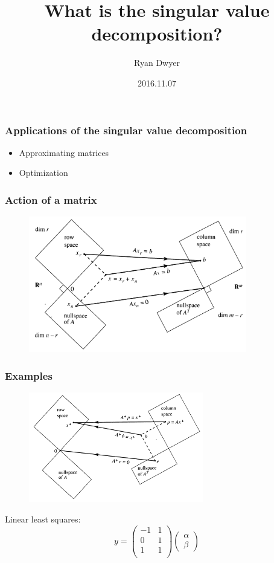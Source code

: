 \documentclass[xcolor={dvipsnames}]{beamer}
\title{What is the singular value decomposition?}
\author{Ryan Dwyer}
\institute{Cornell University}
\date{2016.11.07}
\begin{document}
\frame{\titlepage}

\begin{frame}
\frametitle{Applications of the singular value decomposition}
\begin{itemize}
    \item Approximating matrices
    \item Optimization
\end{itemize}
\end{frame}

\begin{frame}
\frametitle{Action of a matrix}
\begin{figure}
\includegraphics[width=3.75in]{figs/Strang1993nov-fig1.png}
\end{figure}
\end{frame}

\begin{frame}
\frametitle{Examples}
\begin{figure}
\includegraphics[width=3in]{figs/Strang1993nov-fig4.png}
\end{figure}
Linear least squares:
\begin{equation}
y = \begin{pmatrix}
-1 & 1 \\
0 & 1 \\
1 & 1 \\
\end{pmatrix}
\begin{pmatrix}
\alpha \\
\beta
\end{pmatrix}
\end{equation}
\end{frame}
\end{document}
